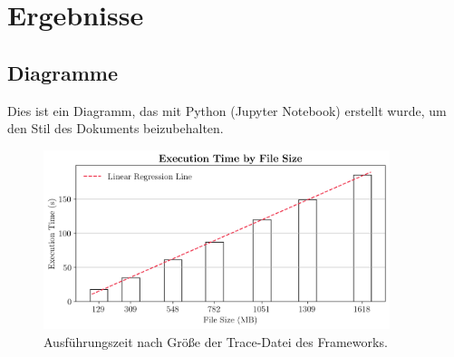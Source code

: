 \chapter{Ergebnisse}
\label{chap:results}

\section{Diagramme}

Dies ist ein Diagramm, das mit Python (Jupyter Notebook) erstellt wurde, um den Stil des Dokuments beizubehalten.

\begin{figure}[htbp]
    \centering
    \includegraphics[width=0.9\textwidth]{figures/execution-time.png}
    \caption{Ausführungszeit nach Größe der Trace-Datei des Frameworks.}
    \label{fig:execution-time}
\end{figure}
